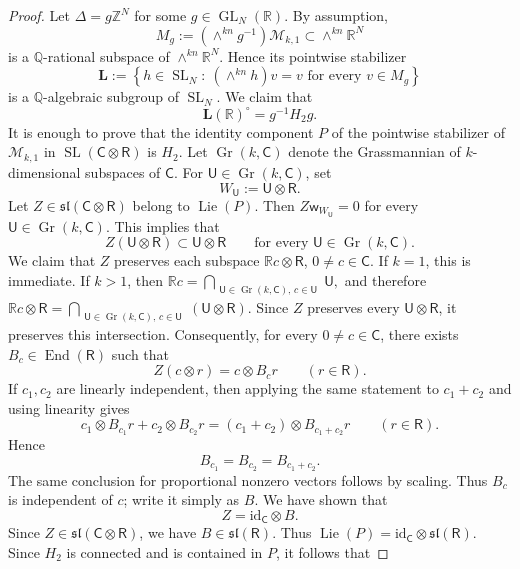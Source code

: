 \documentclass[reqno,11pt]{amsart}
\numberwithin{equation}{section}
\theoremstyle{definition}
\theoremstyle{remark}
\newcommand{\op}{\operatorname}
\newcommand{\br}{\mathbb R}
\newcommand{\GL}{\op{GL}}
\newcommand{\SL}{\op{SL}}
\newcommand{\Gr}{\op{Gr}}
\begin{document}
\begin{proof}  Let $\Delta=g\mathbb Z^N$ for some $g\in \GL_N(\br)$. By assumption, 
$$
M_g:=(\wedge^{kn}g^{-1})\mathcal M_{k,1}
\subset \wedge^{kn}\mathbb R^N 
$$
is a $\mathbb Q$-rational subspace of
$\wedge^{kn}\mathbb R^N$. Hence its pointwise stabilizer
$$
\mathbf L
:=
\left\{
h\in\SL_N:\ (\wedge^{kn}h)v=v
\text{ for every }v\in M_g
\right\}
$$
is a $\mathbb Q$-algebraic subgroup of $\SL_N$. We claim that
\begin{equation}\label{eq:pointwise-stabilizer-exceptional}
\mathbf L(\mathbb R)^\circ=g^{-1}H_2g.
\end{equation}
 It is enough to prove  that the identity component $P$ of
the pointwise stabilizer of $\mathcal M_{k,1}$ in
$\SL(\mathsf C\otimes\mathsf R)$ is $H_2$. Let $\Gr(k,\mathsf C)$ denote the Grassmannian of $k$-dimensional subspaces of $\mathsf C$.
For $\mathsf U\in\Gr(k,\mathsf C)$, set
$$
W_{\mathsf U}:=\mathsf U\otimes\mathsf R.
$$ Let
$Z\in\mathfrak{sl}(\mathsf C\otimes\mathsf R)
$
belong to $\operatorname{Lie}(P)$. Then 
$
Z\mathsf w_{W_{\mathsf U}}=0$ for every $\mathsf U\in\Gr(k,\mathsf C).
$
This implies that
$$
Z(\mathsf U\otimes\mathsf R)\subset \mathsf U\otimes\mathsf R
\qquad
\text{for every }\mathsf U\in\Gr(k,\mathsf C).
$$
We claim that $Z$ preserves each subspace
$\mathbb Rc\otimes\mathsf R$, $0\ne c\in\mathsf C$. If $k=1$, this is
immediate. If $k>1$, then
$\mathbb Rc
=
\bigcap_{\substack{\mathsf U\in\Gr(k,\mathsf C),\, c\in \mathsf U}}\mathsf U,
$
and therefore
$
\mathbb Rc\otimes\mathsf R
=
\bigcap_{\substack{\mathsf U\in\Gr(k,\mathsf C),\,  c\in \mathsf U}}
(\mathsf U\otimes\mathsf R).
$
Since $Z$ preserves every $\mathsf U\otimes\mathsf R$, it preserves this
intersection.
Consequently, for every $0\ne c\in\mathsf C$, there exists
$B_c\in\operatorname{End}(\mathsf R)$ such that
$$
Z(c\otimes r)=c\otimes B_c r
\qquad(r\in\mathsf R).
$$
If $c_1,c_2$ are linearly independent, then applying the same statement to
$c_1+c_2$ and using linearity gives
$$
c_1\otimes B_{c_1}r+c_2\otimes B_{c_2}r
=
(c_1+c_2)\otimes B_{c_1+c_2}r
\qquad(r\in\mathsf R).
$$
Hence
$$
B_{c_1}=B_{c_2}=B_{c_1+c_2}.
$$
The same conclusion for proportional nonzero vectors follows by scaling.
Thus $B_c$ is independent of $c$; write it simply as $B$. We have shown
that
$$
Z=\mathrm{id}_{\mathsf C}\otimes B.
$$
Since $Z\in\mathfrak{sl}(\mathsf C\otimes\mathsf R)$, we have $B\in\mathfrak{sl}(\mathsf R)$.
Thus
$
\operatorname{Lie}(P)
=
\mathrm{id}_{\mathsf C}\otimes\mathfrak{sl}(\mathsf R).
$
Since $H_2$ is connected and is contained in $P$, it follows that

\end{proof}
\end{document}
